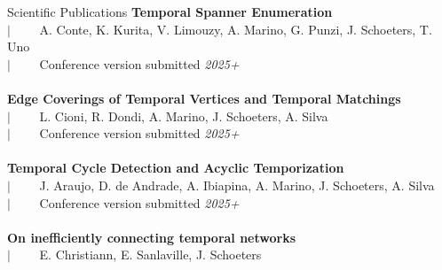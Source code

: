 \documentclass[french]{resume} %
\begin{document}
	\newpage
	\begin{rSection}{Scientific Publications }
		{\bf Temporal Spanner Enumeration}\\
		$| \qquad$ A. Conte, K. Kurita, V. Limouzy,	A. Marino,
		G. Punzi, J. Schoeters, T. Uno\\
		$| \qquad$ Conference version submitted \hfill {\em 2025+}
		\\
		\\
		{\bf Edge Coverings of Temporal Vertices and Temporal Matchings}\\
		$| \qquad$ L. Cioni, R. Dondi, A. Marino, J. Schoeters, A. Silva\\
		$| \qquad$ Conference version submitted \hfill {\em 2025+}
		\\
		\\
		{\bf Temporal Cycle Detection and Acyclic Temporization}\\
		$| \qquad$ J. Araujo, D. de Andrade, A. Ibiapina, A. Marino, J. Schoeters, A. Silva\\
		$| \qquad$ Conference version submitted \hfill {\em 2025+}
		\\
		\\
		{\bf On inefficiently connecting temporal networks}\\
		$| \qquad$ E. Christiann, E. Sanlaville, J. Schoeters\\

\end{rSection}
\end{document}

